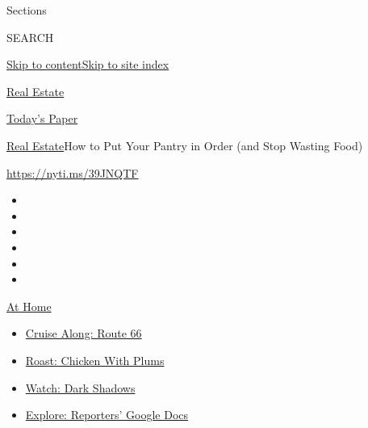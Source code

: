 Sections

SEARCH

\protect\hyperlink{site-content}{Skip to
content}\protect\hyperlink{site-index}{Skip to site index}

\href{https://www.nytimes3xbfgragh.onion/section/realestate}{Real
Estate}

\href{https://myaccount.nytimes3xbfgragh.onion/auth/login?response_type=cookie\&client_id=vi}{}

\href{https://www.nytimes3xbfgragh.onion/section/todayspaper}{Today's
Paper}

\href{/section/realestate}{Real Estate}\textbar{}How to Put Your Pantry
in Order (and Stop Wasting Food)

\url{https://nyti.ms/39JNQTF}

\begin{itemize}
\item
\item
\item
\item
\item
\item
\end{itemize}

\href{https://www.nytimes3xbfgragh.onion/spotlight/at-home?action=click\&pgtype=Article\&state=default\&region=TOP_BANNER\&context=at_home_menu}{At
Home}

\begin{itemize}
\tightlist
\item
  \href{https://www.nytimes3xbfgragh.onion/2020/09/07/travel/route-66.html?action=click\&pgtype=Article\&state=default\&region=TOP_BANNER\&context=at_home_menu}{Cruise
  Along: Route 66}
\item
  \href{https://www.nytimes3xbfgragh.onion/2020/09/04/dining/sheet-pan-chicken.html?action=click\&pgtype=Article\&state=default\&region=TOP_BANNER\&context=at_home_menu}{Roast:
  Chicken With Plums}
\item
  \href{https://www.nytimes3xbfgragh.onion/2020/09/04/arts/television/dark-shadows-stream.html?action=click\&pgtype=Article\&state=default\&region=TOP_BANNER\&context=at_home_menu}{Watch:
  Dark Shadows}
\item
  \href{https://www.nytimes3xbfgragh.onion/interactive/2020/at-home/even-more-reporters-editors-diaries-lists-recommendations.html?action=click\&pgtype=Article\&state=default\&region=TOP_BANNER\&context=at_home_menu}{Explore:
  Reporters' Google Docs}
\end{itemize}

